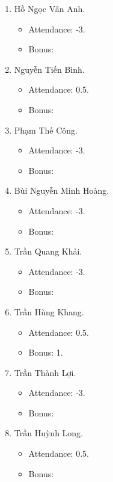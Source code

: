 \documentclass{article}
\begin{document}
\begin{enumerate}
    \item {\sc Hồ Ngọc Vân Anh.}
    \begin{itemize}
        \item Attendance: -3.
        \item Bonus:
    \end{itemize}
    \item {\sc Nguyễn Tiến Bình.}
    \begin{itemize}
        \item Attendance: 0.5.
        \item Bonus:
    \end{itemize}
    \item {\sc Phạm Thế Công.}
    \begin{itemize}
        \item Attendance: -3.
        \item Bonus:
    \end{itemize}
    \item {\sc Bùi Nguyễn Minh Hoàng.}
    \begin{itemize}
        \item Attendance: -3.
        \item Bonus:
    \end{itemize}
    \item {\sc Trần Quang Khải.}
    \begin{itemize}
        \item Attendance: -3.
        \item Bonus:
    \end{itemize}
    \item {\sc Trần Hùng Khang.}
    \begin{itemize}
        \item Attendance: 0.5.
        \item Bonus: 1.
    \end{itemize}
    \item {\sc Trần Thành Lợi.}
    \begin{itemize}
        \item Attendance: -3.
        \item Bonus:
    \end{itemize}
    \item {\sc Trần Huỳnh Long.}
    \begin{itemize}
        \item Attendance: 0.5.
        \item Bonus:
    \end{itemize}

\end{enumerate}
\end{document}
